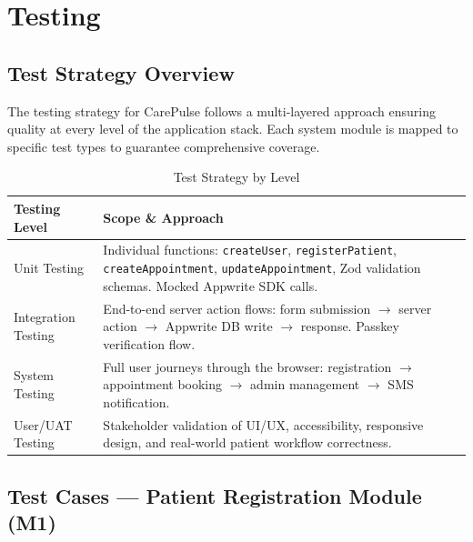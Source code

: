 \documentclass[11pt,a4paper]{article}
\begin{document}
\newpage
\section{Testing}

\subsection{Test Strategy Overview}

The testing strategy for CarePulse follows a multi-layered approach ensuring quality at every level of the application stack. Each system module is mapped to specific test types to guarantee comprehensive coverage.

\begin{table}[H]
\centering
\caption{Test Strategy by Level}
\begin{tabular}{|p{3cm}|p{10cm}|}
\hline
\textbf{Testing Level} & \textbf{Scope \& Approach} \\
\hline
Unit Testing & Individual functions: \texttt{createUser}, \texttt{registerPatient}, \texttt{createAppointment}, \texttt{updateAppointment}, Zod validation schemas. Mocked Appwrite SDK calls. \\
\hline
Integration Testing & End-to-end server action flows: form submission $\rightarrow$ server action $\rightarrow$ Appwrite DB write $\rightarrow$ response. Passkey verification flow. \\
\hline
System Testing & Full user journeys through the browser: registration $\rightarrow$ appointment booking $\rightarrow$ admin management $\rightarrow$ SMS notification. \\
\hline
User/UAT Testing & Stakeholder validation of UI/UX, accessibility, responsive design, and real-world patient workflow correctness. \\
\hline
\end{tabular}
\end{table}

\subsection{Test Cases --- Patient Registration Module (M1)}
\end{document}
